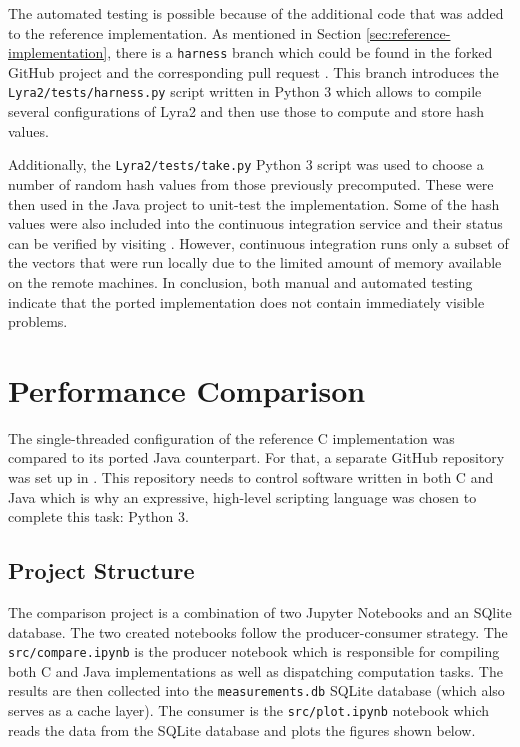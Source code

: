 The automated testing is possible because of the additional code that was added to the reference implementation. As mentioned in Section \ref{sec:reference-implementation}, there is a \verb|harness| branch which could be found in the forked GitHub project \cite{github:2017:lyra-copy} and the corresponding pull request \cite{github:2017:lyra-pr}. This branch introduces the \verb|Lyra2/tests/harness.py| script written in Python 3 which allows to compile several configurations of Lyra2 and then use those to compute and store hash values.

Additionally, the \verb|Lyra2/tests/take.py| Python 3 script was used to choose a number of random hash values from those previously precomputed. These were then used in the Java project to unit-test the implementation. Some of the hash values were also included into the continuous integration service and their status can be verified by visiting \cite{travis:2017:lyra}. However, continuous integration runs only a subset of the vectors that were run locally due to the limited amount of memory available on the remote machines. In conclusion, both manual and automated testing indicate that the ported implementation does not contain immediately visible problems.

\section{Performance Comparison}
\label{sec:performance-comparison}

The single-threaded configuration of the reference C implementation was compared to its ported Java counterpart. For that, a separate GitHub repository was set up in \cite{github:2017:lyra2-compare}. This repository needs to control software written in both C and Java which is why an expressive, high-level scripting language was chosen to complete this task: Python 3.

\subsection{Project Structure}

The comparison project \cite{github:2017:lyra2-compare} is a combination of two Jupyter Notebooks \cite{jupyter:2017:jupyter} and an SQlite database. The two created notebooks follow the producer-consumer strategy. The \texttt{src/compare.ipynb} is the producer notebook which is responsible for compiling both C and Java implementations as well as dispatching computation tasks. The results are then collected into the \texttt{measurements.db} SQLite database (which also serves as a cache layer). The consumer is the \texttt{src/plot.ipynb} notebook which reads the data from the SQLite database and plots the figures shown below.

